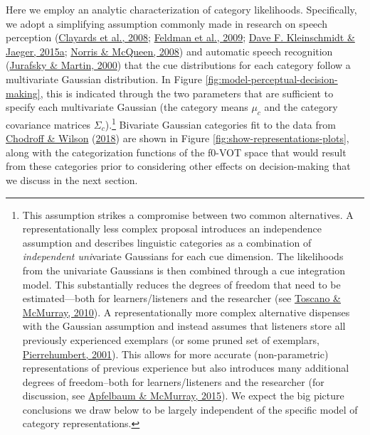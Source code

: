 \documentclass[
  11pt,
  english,
  man,floatsintext]{apa6}
\begin{document}
Here we employ an analytic characterization of category likelihoods. Specifically, we adopt a simplifying assumption commonly made in research on speech perception (\protect\hyperlink{ref-clayards2008}{Clayards et al., 2008}; \protect\hyperlink{ref-feldman2009}{Feldman et al., 2009}; \protect\hyperlink{ref-kleinschmidt-jaeger2015}{Dave F. Kleinschmidt \& Jaeger, 2015a}; \protect\hyperlink{ref-norris-mcqueen2008}{Norris \& McQueen, 2008}) and automatic speech recognition (\protect\hyperlink{ref-jurafsky-martin2000}{Jurafsky \& Martin, 2000}) that the cue distributions for each category follow a multivariate Gaussian distribution. In Figure \ref{fig:model-perceptual-decision-making}, this is indicated through the two parameters that are sufficient to specify each multivariate Gaussian (the category means \(\mu_c\) and the category covariance matrices \(\Sigma_c\)).\footnote{\label{fn:alternative-representational-changes} This assumption strikes a compromise between two common alternatives. A representationally less complex proposal introduces an independence assumption and describes linguistic categories as a combination of \emph{independent uni}variate Gaussians for each cue dimension. The likelihoods from the univariate Gaussians is then combined through a cue integration model. This substantially reduces the degrees of freedom that need to be estimated---both for learners/listeners and the researcher (see \protect\hyperlink{ref-toscano-mcmurray2010}{Toscano \& McMurray, 2010}). A representationally more complex alternative dispenses with the Gaussian assumption and instead assumes that listeners store all previously experienced exemplars (or some pruned set of exemplars, \protect\hyperlink{ref-pierrehumbert2001}{Pierrehumbert, 2001}). This allows for more accurate (non-parametric) representations of previous experience but also introduces many additional degrees of freedom--both for learners/listeners and the researcher (for discussion, see \protect\hyperlink{ref-apfelbaum-mcmurray2015}{Apfelbaum \& McMurray, 2015}). We expect the big picture conclusions we draw below to be largely independent of the specific model of category representations.} Bivariate Gaussian categories fit to the data from \protect\hyperlink{ref-chodroff-wilson2018}{Chodroff \& Wilson} (\protect\hyperlink{ref-chodroff-wilson2018}{2018}) are shown in Figure \ref{fig:show-representations-plots}, along with the categorization functions of the f0-VOT space that would result from these categories prior to considering other effects on decision-making that we discuss in the next section.
\end{document}
